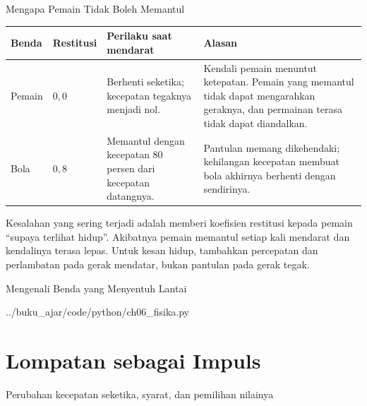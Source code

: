 \documentclass[aspectratio=169,10pt]{beamer}
\begin{document}
\begin{frame}{Mengapa Pemain Tidak Boleh Memantul}
{\scriptsize
\renewcommand{\arraystretch}{1.14}
\begin{tabularx}{\textwidth}{@{}>{\raggedright\arraybackslash}p{1.8cm}
    >{\centering\arraybackslash}p{1.7cm}
    >{\raggedright\arraybackslash}p{4.5cm}
    >{\raggedright\arraybackslash}X@{}}
\toprule
\textbf{Benda} & \textbf{Restitusi} & \textbf{Perilaku saat mendarat}
  & \textbf{Alasan} \\
\midrule
Pemain & $0{,}0$ &
  Berhenti seketika; kecepatan tegaknya menjadi nol. &
  Kendali pemain menuntut ketepatan. Pemain yang memantul tidak dapat
  mengarahkan geraknya, dan permainan terasa tidak dapat diandalkan. \\
\addlinespace
Bola & $0{,}8$ &
  Memantul dengan kecepatan 80 persen dari kecepatan datangnya. &
  Pantulan memang dikehendaki; kehilangan kecepatan membuat bola akhirnya
  berhenti dengan sendirinya. \\
\bottomrule
\end{tabularx}}
\vspace{0.14cm}
\begin{peringatan}
Kesalahan yang sering terjadi adalah memberi koefisien restitusi kepada pemain
``supaya terlihat hidup''. Akibatnya pemain memantul setiap kali mendarat dan
kendalinya terasa lepas. Untuk kesan hidup, tambahkan percepatan dan
perlambatan pada gerak mendatar, bukan pantulan pada gerak tegak.
\end{peringatan}
\end{frame}

\begin{frame}[fragile]{Mengenali Benda yang Menyentuh Lantai}

  {../buku_ajar/code/python/ch06_fisika.py}
\end{frame}

\section{Lompatan sebagai Impuls}
  {Perubahan kecepatan seketika, syarat, dan pemilihan nilainya}
\end{document}
